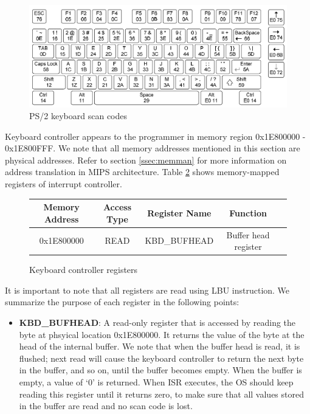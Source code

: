 \documentclass[oneside]{book}
\begin{document}
\begin{figure}[H]
\begin{center}
\includegraphics[width=\textwidth]{scancodes.png}
\end{center}
\caption{PS/2 keyboard scan codes}
\label{scancodes}
\end{figure}

Keyboard controller appears to the programmer in memory region
0x1E800000 - 0x1E800FFF. We note that all memory addresses mentioned in this
section are physical addresses. Refer to section \ref{ssec:memman} for
more information on address translation in MIPS architecture. Table
\ref{kbdregs} shows memory-mapped registers of interrupt controller.\\

\begin{figure}[H]
\begin{center}
\begin{tabular}{|c|c|c|c|c|}

\hline \textbf{Memory Address} & \textbf{Access Type} &
       \textbf{Register Name} & \textbf{Function}  \\

\hline 0x1E800000 & READ & KBD\_BUFHEAD & Buffer head register \\
\hline

\end{tabular}
\end{center}
\caption{Keyboard controller registers}
\label{kbdregs}
\end{figure}

It is important to note that all registers are read using
LBU instruction. We summarize the purpose of each
register in the following points:

\begin{itemize}

\item \textbf{KBD\_BUFHEAD}:
A read-only register that is accessed by reading the byte at phsyical
location 0x1E800000. It returns the value of the byte at the head of
the internal buffer. We note that when the buffer head is read,
it is flushed; next read will cause the keyboard controller to return
the next byte in the buffer, and so on, until the buffer becomes empty.
When the buffer is empty, a value of `0' is returned. When ISR executes, the
OS should keep reading this register until it returns zero, to make sure
that all values stored in the buffer are read and no scan code is lost.

\end{itemize}
\end{document}
